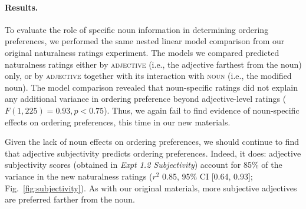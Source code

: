 \documentclass[12pt]{article}
\begin{document}
\paragraph{Results.}

To evaluate the role of specific noun information in determining ordering preferences, we performed the same nested linear model comparison from our original naturalness ratings experiment. The models we compared predicted naturalness ratings either by \textsc{adjective} (i.e., the adjective farthest from the noun) only, or by \textsc{adjective} together with its interaction with \textsc{noun} (i.e., the modified noun).
The model comparison revealed that noun-specific ratings did not explain any additional variance in ordering preference beyond adjective-level ratings ($F(1,225) = 0.93, p < 0.75$).  Thus, we again fail to find evidence of noun-specific effects on ordering preferences, this time in our new materials. 

%
%
%
%
%


Given the lack of noun effects on ordering preferences, we should continue to find that adjective subjectivity predicts ordering preferences. Indeed, it does: adjective subjectivity scores (obtained in \emph{Expt 1.2 Subjectivity}) account for  85\% of the variance in the new naturalness ratings ($r^2$ 0.85, 95\% CI [0.64,  0.93]; Fig.~\ref{fig:subjectivity}). 
As with our original materials, more subjective adjectives are preferred farther from the noun.
\end{document}
